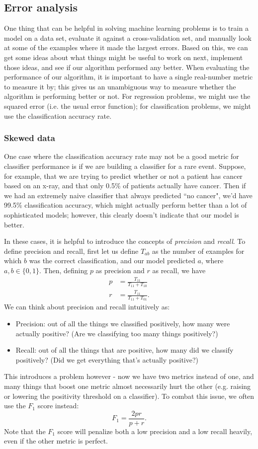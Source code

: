 \documentclass{article}
\begin{document}
\subsection{Error analysis}
One thing that can be helpful in solving machine learning problems is to train a model on a data set, evaluate it against a cross-validation set, and manually look at some of the examples where it made the largest errors. Based on this, we can get some ideas about what things might be useful to work on next, implement those ideas, and see if our algorithm performed any better. When evaluating the performance of our algorithm, it is important to have a single real-number metric to measure it by; this gives us an unambiguous way to measure whether the algorithm is performing better or not. For regression problems, we might use the squared error (i.e. the usual error function); for classification problems, we might use the classification accuracy rate.

\subsubsection{Skewed data}
One case where the classification accuracy rate may not be a good metric for classifier performance is if we are building a classifier for a rare event. Suppose, for example, that we are trying to predict whether or not a patient has cancer based on an x-ray, and that only 0.5\% of patients actually have cancer. Then if we had an extremely naive classifier that always predicted ``no cancer", we'd have 99.5\% classification accuracy, which might actually perform better than a lot of sophisticated models; however, this clearly doesn't indicate that our model is better.

In these cases, it is helpful to introduce the concepts of \emph{precision} and \emph{recall}. To define precision and recall, first let us define $T_{ab}$ as the number of examples for which $b$ was the correct classification, and our model predicted $a$, where $a, b \in \{0, 1\}$. Then, defining $p$ as precision and $r$ as recall, we have
\begin{align*}
p &= \frac{T_{11}}{T_{11} + T_{10}}\\
r &= \frac{T_{11}}{T_{11} + T_{01}}.
\end{align*}
We can think about precision and recall intuitively as:
\begin{itemize}
\item Precision: out of all the things we classified positively, how many were actually positive? (Are we classifying too many things positively?)
\item Recall: out of all the things that are positive, how many did we classify positively? (Did we get everything that's actually positive?)
\end{itemize}
This introduces a problem however - now we have two metrics instead of one, and many things that boost one metric almost necessarily hurt the other (e.g. raising or lowering the positivity threshold on a classifier). To combat this issue, we often use the $F_1$ score instead:
$$F_1 = \frac{2pr}{p + r}.$$
Note that the $F_1$ score will penalize both a low precision and a low recall heavily, even if the other metric is perfect.
\end{document}

